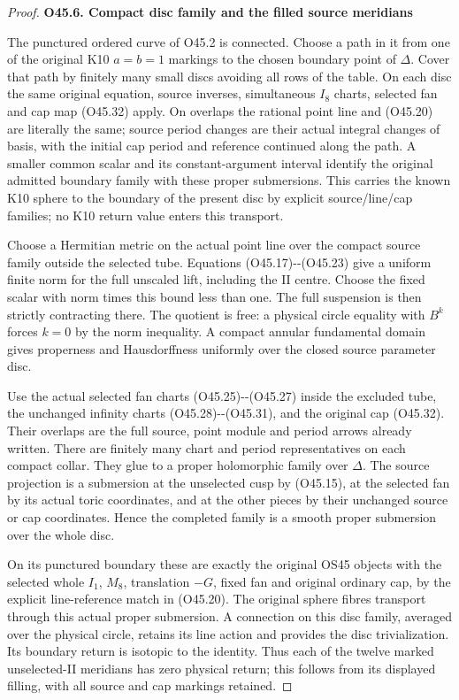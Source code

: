 \begin{proof}
\par

\medskip\noindent\textbf{O45.6. Compact disc family and the filled source meridians}

\par\nobreak

The punctured ordered curve of O45.2 is connected. Choose
a path in it from one of the original K10 \(a=b=1\)
markings to the chosen boundary point of \(\Delta\).
Cover that path by finitely many small discs avoiding
all rows of the table. On each disc the same original
equation, source inverses, simultaneous \(I_8\) charts,
selected fan and cap map (O45.32) apply. On overlaps
the rational point line and (O45.20) are literally
the same; source period changes are their actual
integral changes of basis, with the initial cap
period and reference continued along the path.
A smaller common scalar and its constant-argument
interval identify the original admitted boundary
family with these proper submersions. This carries
the known K10 sphere to the boundary of the present
disc by explicit source/line/cap families; no K10
return value enters this transport.

Choose a Hermitian metric on the actual point line over
the compact source family outside the selected tube.
Equations (O45.17)-\/-(O45.23) give a uniform finite norm
for the full unscaled lift, including the II centre.
Choose the fixed scalar with norm times this bound less
than one. The full suspension is then strictly
contracting there. The quotient is free: a physical
circle equality with \(B^k\) forces \(k=0\) by the norm
inequality. A compact annular fundamental domain gives
properness and Hausdorffness uniformly over the closed
source parameter disc.

Use the actual selected fan charts (O45.25)-\/-(O45.27)
inside the excluded tube, the unchanged infinity
charts (O45.28)-\/-(O45.31), and the original cap
(O45.32). Their overlaps are the full source, point
module and period arrows already written. There are
finitely many chart and period representatives on
each compact collar. They glue to a proper holomorphic
family over \(\Delta\). The source projection is a
submersion at the unselected cusp by (O45.15), at the
selected fan by its actual toric coordinates, and at
the other pieces by their unchanged source or cap
coordinates. Hence the completed family is a smooth
proper submersion over the whole disc.

On its punctured boundary these are exactly the
original OS45 objects with the selected whole \(I_1\),
\(M_8\), translation \(-G\), fixed fan and original
ordinary cap, by the explicit line-reference match
in (O45.20). The original sphere fibres transport
through this actual proper submersion. A connection
on this disc family, averaged over the physical
circle, retains its line action and provides the
disc trivialization. Its boundary return is isotopic
to the identity. Thus each of the twelve marked
unselected-II meridians has zero physical return;
this follows from its displayed filling, with all
source and cap markings retained.


\end{proof}
